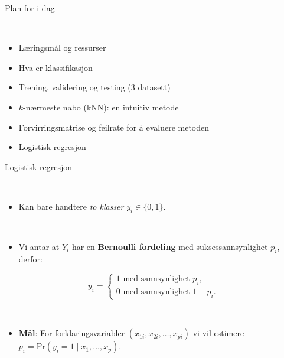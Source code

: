 \documentclass[10pt,ignorenonframetext,]{beamer}
\providecommand{\tightlist}{%
  \setlength{\itemsep}{0pt}\setlength{\parskip}{0pt}}
\begin{document}
\begin{frame}{Plan for i dag}
\protect\hypertarget{plan-for-i-dag-1}{}

\(~\)

\begin{itemize}
\item
  Læringsmål og ressurser
\item
  Hva er klassifikasjon
\item
  Trening, validering og testing (3 datasett)
\item
  \(k\)-nærmeste nabo (kNN): en intuitiv metode
\item
  Forvirringsmatrise og feilrate for å evaluere metoden
\item
  Logistisk regresjon
\end{itemize}

\end{frame}

\begin{frame}{Logistisk regresjon}
\protect\hypertarget{logistisk-regresjon}{}

\(~\)

\begin{itemize}
\tightlist
\item
  Kan bare handtere \emph{to klasser} \(y_i \in \{0,1\}\).
\end{itemize}

\(~\)

\begin{itemize}
\tightlist
\item
  Vi antar at \(Y_i\) har en \textbf{Bernoulli fordeling} med
  suksessannsynlighet \(p_i\), derfor:
\end{itemize}

\[y_i = \begin{cases} 1 \text{ med sannsynlighet } p_i, \\ 0 \text{ med sannsynlighet } 1-p_i. \end{cases}\]

\(~\)

\begin{itemize}
\tightlist
\item
  \textbf{Mål}: For forklaringsvariabler
  \((x_{1i},x_{2i},\ldots,x_{pi})\) vi vil estimere
  \(p_i = \text{Pr}(y_i=1 \mid x_1,\ldots,x_p)\).
\end{itemize}

\end{frame}
\end{document}
